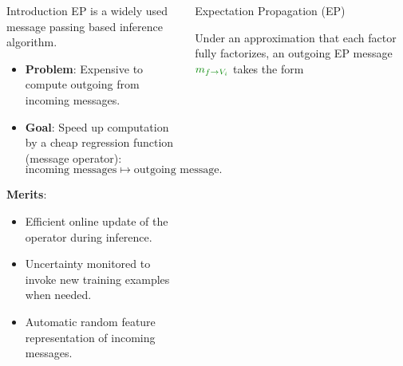 \documentclass[english]{beamer}
\DeclareMathOperator*{\proj}{\text{proj}} %
\begin{document}
\begin{frame}


\begin{columns}[t]


\begin{block}{Introduction }
EP is a widely used message passing based inference algorithm. 
\begin{itemize}
    \item \textbf{Problem}: Expensive to compute outgoing from incoming messages.
    \item \textbf{Goal}: Speed up computation by a cheap regression function
        (message operator): 
    \begin{equation*}
        \text{incoming messages} \mapsto \text{outgoing message}.
    \end{equation*}
\end{itemize}
%
\vspace*{-8mm}
\textbf{Merits}:
\begin{itemize}
    \item Efficient online update of the operator during inference.
    \item Uncertainty monitored to invoke new training examples when needed. 
    \item Automatic random feature representation of incoming messages.
\end{itemize}


\end{block}

\begin{block}{Expectation Propagation (EP)}

Under an approximation that each factor fully factorizes, an outgoing EP
message $\textcolor{mygreen}{m_{f\rightarrow V_i}}$ takes the form
\vspace{5mm}
 

\end{block}
\end{columns}
\end{frame}
\end{document}
